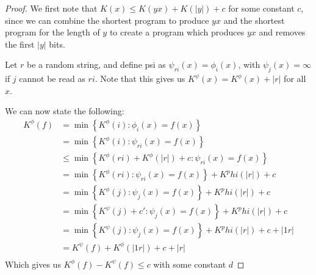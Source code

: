 \documentclass{article}
\begin{document}
\begin{proof}
We first note that $K(x) \leq K(yx) + K(|y|) + c$ for some constant $c$, since we can combine the shortest program to produce $yx$ and the shortest program for the length of $y$ to create a program which produces $yx$ and removes the first $|y|$ bits.

Let $r$ be a random string, and define psi as $\psi_{ri}(x) = \phi_{i}(x)$, with $\psi_{j}(x) = \infty$ if $j$ cannot be read as $ri$. Note that this gives us $K^\psi(x) = K^\phi(x) + |r|$ for all $x$.

We can now state the following:
\[\begin{split}
K^\phi(f) &= \min\left\{ K^\phi(i) : \phi_i(x) = f(x) \right\} \\
       &= \min\left\{ K^\phi(i) : \psi_{ri}(x) = f(x) \right\} \\
       &\leq \min\left\{ K^\phi(ri) + K^\phi(|r|) + c : \psi_{ri}(x) = f(x) \right\} \\
       &= \min\left\{ K^\phi(ri) : \psi_{ri}(x) = f(x) \right\} + K^phi(|r|) + c \\
       &= \min\left\{ K^\phi(j) : \psi_{j}(x) = f(x) \right\} + K^phi(|r|) + c \\
       &= \min\left\{ K^\psi(j) + c' : \psi_{j}(x) = f(x) \right\} + K^phi(|r|) + c \\
       &= \min\left\{ K^\psi(j) : \psi_{j}(x) = f(x) \right\} + K^phi(|r|) + c + |1r|\\
       &= K^\psi(f) + K^\phi(|1r|) + c + |r|\\
\end{split}\]
Which gives us $K^\phi(f) - K^\psi(f) \leq c$ with some constant $d$

\end{proof}




\end{document}
